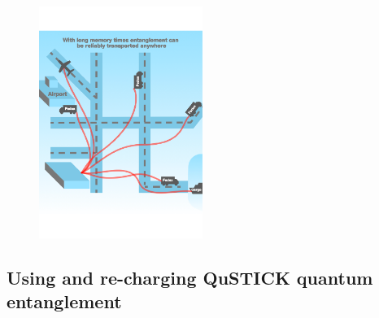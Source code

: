 \documentclass[twocolumn, aps, rmp, amsmath, amssymb, nofootinbib, superscriptaddress, longbibliography, floatfix, table-of-contents, eqsecnum]{revtex4-2}
\begin{document}
\begin{figure}[htbp!]
	\includegraphics[clip=true, width=0.475\textwidth]{qustick3}
	\caption{}
	\label{fig:distribution}
\end{figure}

\subsection{Using and re-charging QuSTICK quantum entanglement}
\end{document}
